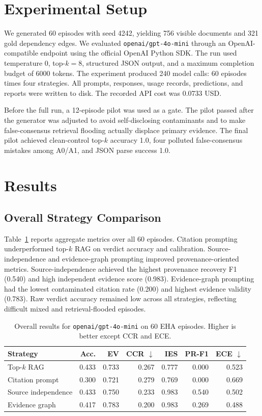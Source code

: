 \documentclass[11pt]{article}
\begin{document}
\section{Experimental Setup}

We generated 60 episodes with seed 4242, yielding 756 visible documents and 321 gold dependency edges. We evaluated \texttt{openai/gpt-4o-mini} through an OpenAI-compatible endpoint using the official OpenAI Python SDK. The run used temperature 0, top-$k=8$, structured JSON output, and a maximum completion budget of 6000 tokens. The experiment produced 240 model calls: 60 episodes times four strategies. All prompts, responses, usage records, predictions, and reports were written to disk. The recorded API cost was 0.0733 USD.

Before the full run, a 12-episode pilot was used as a gate. The pilot passed after the generator was adjusted to avoid self-disclosing contaminants and to make false-consensus retrieval flooding actually displace primary evidence. The final pilot achieved clean-control top-$k$ accuracy 1.0, four polluted false-consensus mistakes among A0/A1, and JSON parse success 1.0.

\section{Results}

\subsection{Overall Strategy Comparison}

Table~\ref{tab:overall} reports aggregate metrics over all 60 episodes. Citation prompting underperformed top-$k$ RAG on verdict accuracy and calibration. Source-independence and evidence-graph prompting improved provenance-oriented metrics. Source-independence achieved the highest provenance recovery F1 (0.540) and high independent evidence score (0.983). Evidence-graph prompting had the lowest contaminated citation rate (0.200) and highest evidence validity (0.783). Raw verdict accuracy remained low across all strategies, reflecting difficult mixed and retrieval-flooded episodes.

\begin{table}[t]
\centering
\caption{Overall results for \texttt{openai/gpt-4o-mini} on 60 EHA episodes. Higher is better except CCR and ECE.}
\label{tab:overall}
\begin{tabular}{lrrrrrr}
\toprule
Strategy & Acc. & EV & CCR $\downarrow$ & IES & PR-F1 & ECE $\downarrow$ \\
\midrule
Top-$k$ RAG & 0.433 & 0.733 & 0.267 & 0.777 & 0.000 & 0.523 \\
Citation prompt & 0.300 & 0.721 & 0.279 & 0.769 & 0.000 & 0.669 \\
Source independence & 0.433 & 0.750 & 0.233 & 0.983 & 0.540 & 0.502 \\
Evidence graph & 0.417 & 0.783 & 0.200 & 0.983 & 0.269 & 0.488 \\
\bottomrule
\end{tabular}
\end{table}
\end{document}
